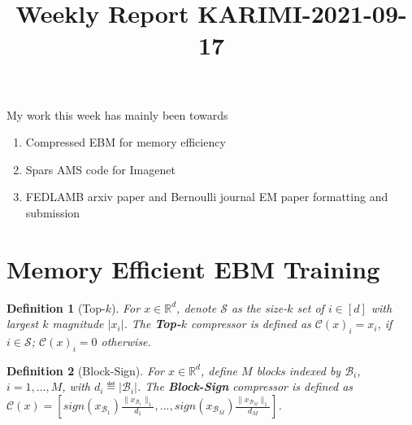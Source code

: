 \documentclass{article}
\newtheorem{definition}{Definition}
\begin{document}
\title{Weekly Report KARIMI-2021-09-17}


\date{}
\maketitle

\vspace{-0.5in}

My work this week has mainly been towards
\begin{enumerate}
\item Compressed EBM for memory efficiency
\item Spars AMS code for Imagenet
\item FEDLAMB arxiv paper and Bernoulli journal EM paper formatting and submission
\end{enumerate}



\section{Memory Efficient EBM Training}


\begin{definition}[Top-$k$]\label{def:topk}
For $x\in\mathbb R^d$, denote $\mathcal S$ as the size-$k$ set of $i\in[d]$ with largest $k$ magnitude $|x_i|$. The \textbf{Top-$k$} compressor is defined as $\mathcal C(x)_i=x_i$, if $i\in\mathcal S$; $\mathcal C(x)_i=0$ otherwise.
\end{definition}

\begin{definition}[Block-Sign]\label{def:sign}
For $x\in\mathbb R^d$, define $M$ blocks indexed by $\mathcal B_i$, $i=1,...,M$, with $d_i\eqdef |\mathcal B_i|$. The \textbf{Block-Sign} compressor is defined as $\mathcal C(x)=[sign(x_{\mathcal B_1})\frac{\|x_{\mathcal B_1}\|_1}{d_1},..., sign(x_{\mathcal B_M}) \frac{\|x_{\mathcal B_M}\|_1}{d_M}]$. 
\end{definition}
\end{document}
